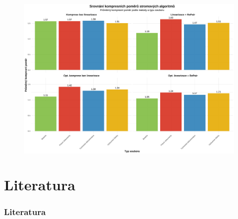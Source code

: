 \documentclass[lualatex,hyperref={pdfencoding=auto}]{beamer}
\begin{document}
\begin{frame}
  \begin{figure}
    \centering
    \includegraphics[width=\textwidth]{fig/presentation_overview.pdf}
    \label{fig:presentation_overview}
  \end{figure}
\end{frame}

\section{Literatura}
\begin{frame}[allowframebreaks]
    \frametitle{Literatura}
    \printbibliography[heading=none]
\end{frame}
\end{document}
